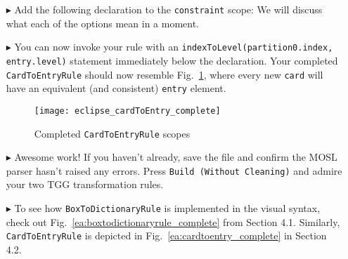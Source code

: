 \begin{itemize}

\item[$\blacktriangleright$] Add the following declaration to the \texttt{constraint} scope:  We will discuss what
each of the options mean in a moment.

\vspace{0.5cm}

\item[$\blacktriangleright$] You can now invoke your rule with an \texttt{indexToLevel(partition0.index, entry.level)} statement immediately below the
declaration. Your completed \texttt{CardToEntryRule} should now resemble Fig.~\ref{eclipse:c2eDone}, where every new \texttt{card} will have an equivalent
(and consistent) \texttt{entry} element.

\begin{figure}[htbp]
\begin{center}
  \texttt{[image: eclipse\_cardToEntry\_complete]}
  \caption{Completed \texttt{CardToEntryRule} scopes}
  \label{eclipse:c2eDone}
\end{center}
\end{figure}

\vspace{0.5cm}

\item[$\blacktriangleright$] Awesome work! If you haven't already, save the file and confirm the MOSL parser hasn't raised any errors. Press \texttt{Build
(Without Cleaning)} and admire your two TGG transformation rules. 

\vspace{0.5cm}

\item[$\blacktriangleright$] To see how \texttt{BoxToDictionaryRule} is implemented in the visual syntax, check out Fig.~\ref{ea:boxtodictionaryrule_complete}
from Section 4.1. Similarly, \texttt{CardToEntryRule} is depicted in Fig.~\ref{ea:cardtoentry_complete} in Section 4.2.

\end{itemize}

